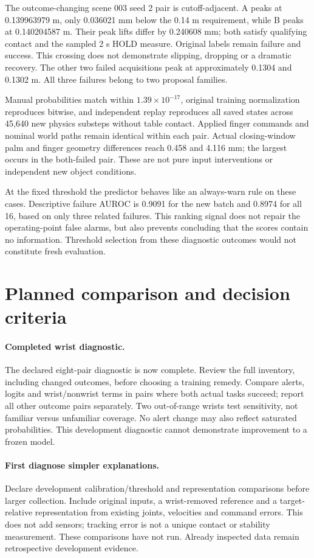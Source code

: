 \documentclass[10pt,letterpaper]{article}
\begin{document}
The outcome-changing scene 003 seed 2 pair is cutoff-adjacent. A peaks at
0.139963979 m, only 0.036021 mm below the 0.14 m requirement, while B peaks at
0.140204587 m. Their peak lifts differ by 0.240608 mm; both satisfy qualifying
contact and the sampled 2 s HOLD measure. Original labels remain failure and
success. This crossing does not demonstrate slipping, dropping or a dramatic
recovery. The other two failed acquisitions peak at approximately 0.1304 and
0.1302 m. All three failures belong to two proposal families.

Manual probabilities match within $1.39\times10^{-17}$, original training
normalization reproduces bitwise, and independent replay reproduces all saved
states across 45,640 new physics substeps without table contact. Applied finger
commands and nominal world paths remain identical within each pair. Actual
closing-window palm and finger geometry differences reach 0.458 and 4.116 mm;
the largest occurs in the both-failed pair. These are not pure input
interventions or independent new object conditions.

At the fixed threshold the predictor behaves like an always-warn rule on these
cases. Descriptive failure AUROC is 0.9091 for the new batch and 0.8974 for all
16, based on only three related failures. This ranking signal does not repair
the operating-point false alarms, but also prevents concluding that the scores
contain no information. Threshold selection from these diagnostic outcomes
would not constitute fresh evaluation.

\section{Planned comparison and decision criteria}
\paragraph{Completed wrist diagnostic.}
The declared eight-pair diagnostic is now complete. Review the full inventory,
including changed outcomes, before choosing a training remedy. Compare
alerts, logits and wrist/nonwrist
terms in pairs where both actual tasks succeed; report all other outcome pairs
separately. Two out-of-range wrists test sensitivity, not familiar versus
unfamiliar coverage. No alert change may also reflect saturated probabilities.
This development diagnostic cannot demonstrate improvement to a frozen model.

\paragraph{First diagnose simpler explanations.}
Declare development calibration/threshold and representation comparisons before
larger collection. Include original inputs, a wrist-removed reference and a
target-relative representation from existing joints, velocities and command
errors. This does not add sensors; tracking error is not a unique contact or
stability measurement. These comparisons have not run. Already inspected data
remain retrospective development evidence.
\end{document}
